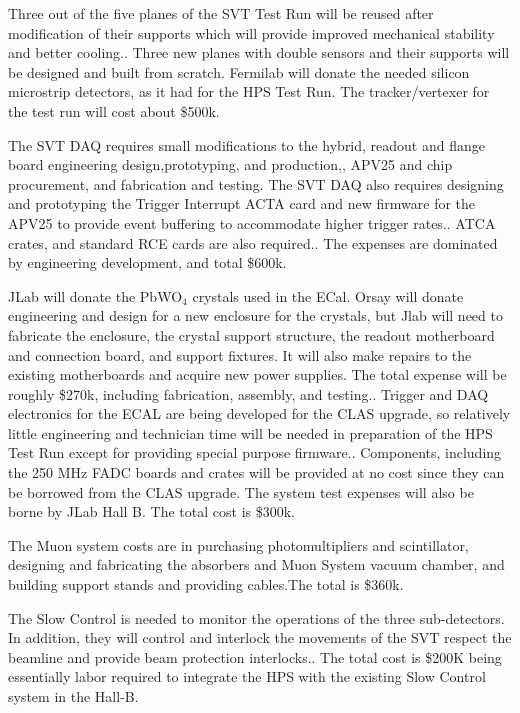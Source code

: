 Three out of the five planes of the SVT Test Run will be reused after modification of their supports which will provide improved mechanical stability and better cooling.. Three new planes with double sensors and their supports will be designed and built from scratch. Fermilab will donate the needed silicon microstrip detectors, as it had for the HPS Test Run. The tracker/vertexer for the test run will cost about \$500k.

The SVT DAQ requires small modifications to the  hybrid, readout  and flange board engineering design,prototyping, and production,, APV25 and chip procurement, and  fabrication and testing. The SVT DAQ also requires designing and prototyping the Trigger Interrupt ACTA card and new firmware for the APV25 to provide event buffering to accommodate higher trigger rates.. ATCA crates, and standard RCE cards are also required.. The expenses are dominated by engineering development, and total \$600k.  

JLab will donate the PbWO$_4$ crystals used in the ECal. Orsay will donate engineering and design for a new enclosure for the crystals, but Jlab will need to fabricate the enclosure, the crystal support structure, the readout motherboard and connection board, and support fixtures. It will also make repairs to the existing motherboards and acquire new power supplies. The total expense will be roughly \$270k, including fabrication, assembly, and testing.. Trigger and DAQ electronics for the ECAL are being developed for the CLAS upgrade, so relatively little engineering and technician time will be needed in preparation of the HPS Test Run except for providing special purpose firmware.. Components, including the 250 MHz FADC boards and crates will be provided at no cost since they can be borrowed from the CLAS upgrade. The system test expenses will also be borne by JLab Hall B. The total cost is \$300k. 

The Muon system costs are in purchasing  photomultipliers and scintillator, designing and fabricating  the absorbers and Muon System vacuum chamber, and building support stands and providing cables.The total is \$360k. 

The Slow Control is needed to monitor the operations of the three sub-detectors. In addition, they will control and interlock the movements of the SVT respect the beamline and provide beam protection interlocks.. The total cost is \$200K being essentially labor required to integrate the HPS with the existing Slow Control system in the Hall-B.

